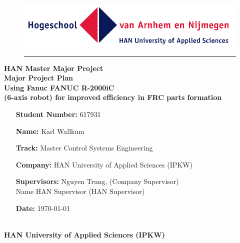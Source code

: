 \begin{titlepage}
	\begin{flushright}
	\begin{minipage}{\linewidth}
		\begin{figure}[H]
			\begin{flushright}
			\includegraphics[width=0.5\linewidth]{Images/HAN}
		\end{flushright}
		\hrule
		\end{figure}
		\begin{flushright}
			\large\textbf{ HAN Master Major Project}\\
			\vspace{20pt}
			\Huge\textbf{Major Project Plan
			\\
			\vspace{10pt}
			Using Fanuc FANUC R-2000iC\\
			(6-axis robot) for improved efficiency in FRC parts formation }
		\end{flushright}
		\vspace{35pt}
		\begin{figure}[H]
		\begin{flushleft}
		\end{flushleft}	
		\end{figure}
		\begin{itemize}[leftmargin=4.5cm]
			\LARGE	
			\item[\textbf{Student Number:}] 617931		
			\item[\textbf{Name:}] Karl Wallkum 			
			\item[\textbf{Track:}] Master Control Systems Engineering
			\item[\textbf{Company:}]  HAN University of Applied Sciences (IPKW)
			\item[\textbf{Supervisors:}]  Nguyen Trung, (Company Supervisor)\\ Name HAN Supervisor (HAN Supervisor)			
			\item[\textbf{Date:}] \today		 		
		\end{itemize}
	\end{minipage}
	\end{flushright}

	\begin{flushleft}
	\large \textbf{
		\vspace{40pt}
		\\HAN University of Applied Sciences (IPKW)
	}


\end{flushleft}
\end{titlepage}
